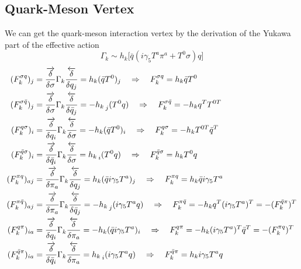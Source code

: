 \documentclass[UTF8]{article}
\begin{document}
\subsection{Quark-Meson Vertex}
We can get the quark-meson interaction vertex by the derivation of the Yukawa part of the effective action
\begin{equation}
\Gamma_k\sim h_k\big[ \bar{q}(i\gamma_5 T^a \pi^a +T^0\sigma)q \big]
\end{equation}
\begin{equation}
\begin{split}
(F^{\sigma q}_k)_j&=\frac{\overrightarrow{\delta}}{\delta\sigma}\Gamma_k\frac{\overleftarrow{\delta}}{\delta q_j}=h_k(\bar{q}T^0)_j\quad\Rightarrow\quad F^{\sigma q}_k=h_k \bar{q}T^0\\
(F^{\sigma \bar{q}}_k)_j&=\frac{\overrightarrow{\delta}}{\delta\sigma}\Gamma_k\frac{\overleftarrow{\delta}}{\delta \bar{q}_j}=-h_k\prescript{}{j}{(T^0 q)}\quad\Rightarrow\quad F^{\sigma \bar{q}}_k=-h_k q^TT^{0T}\\
(F^{q\sigma}_k)_i&=\frac{\overrightarrow{\delta}}{\delta q_i}\Gamma_k\frac{\overleftarrow{\delta}}{\delta \sigma}=-h_k(\bar{q}T^0)_i\quad\Rightarrow\quad F^{q\sigma}_k=-h_k T^{0T}\bar{q}^T\\
(F^{\bar{q}\sigma}_k)_i&=\frac{\overrightarrow{\delta}}{\delta\bar{q}_i}\Gamma_k\frac{\overleftarrow{\delta}}{\delta\sigma}=h_k\prescript{}{i}{(T^0 q)}\quad\Rightarrow\quad F^{\bar{q}\sigma}_k=h_k T^0 q\\
(F^{\pi q}_k)_{aj}&=\frac{\overrightarrow{\delta}}{\delta\pi_a}\Gamma_k\frac{\overleftarrow{\delta}}{\delta q_j}=h_k(\bar{q}i\gamma_5 T^a)_j\quad\Rightarrow\quad F^{\pi q}_k=h_k \bar{q}i\gamma_5T^a\\
(F^{\pi \bar{q}}_k)_{aj}&=\frac{\overrightarrow{\delta}}{\delta\pi_a}\Gamma_k\frac{\overleftarrow{\delta}}{\delta \bar{q}_j}=-h_k\prescript{}{j}(i\gamma_5 T^a q)\quad\Rightarrow\quad F^{\pi \bar{q}}_k=-h_k q^T (i\gamma_5T^a)^T=-(F^{\bar{q}\pi}_k)^T\\
(F^{q\pi}_k)_{ia}&=\frac{\overrightarrow{\delta}}{\delta q_i}\Gamma_k\frac{\overleftarrow{\delta}}{\delta \pi_a}=-h_k(\bar{q}i\gamma_5 T^a)_i\quad\Rightarrow\quad F^{q\pi}_k=-h_k(i\gamma_5T^a)^T\bar{q}^T=-(F^{\pi q}_k)^T\\
(F^{\bar{q}\pi}_k)_{ia}&=\frac{\overrightarrow{\delta}}{\delta \bar{q}_i}\Gamma_k\frac{\overleftarrow{\delta}}{\delta \pi_a}=h_k\prescript{}{i}(i\gamma_5 T^a q)\quad\Rightarrow\quad F^{\bar{q}\pi}_k=h_k i\gamma_5 T^a q 
\end{split}
\end{equation}
\end{document}

